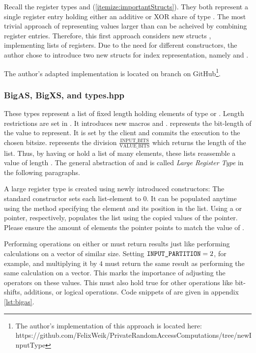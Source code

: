 \label{sub:PossibilityLargerRegisterType}
Recall the register types  and  (\ref{itemize:importantStructs}).
They both represent a single register entry holding either an additive or XOR share of type .
The most trivial approach of representing values larger than  can be acheived by combining register entries.
Therefore, this first approach considers new structs ,  implementing lists of registers.
Due to the need for different constructors, the author chose to introduce two new structs for index representation, namely  and .

The author's adapted implementation is located on branch  on GitHub\footnote{The author's implementation of this approach is located here:\\ https://github.com/FelixWeik/PrivateRandomAccessComputations/tree/newInputType}.

\subsubsection*{BigAS, BigXS, and types.hpp} \label{subsub:BigASandBigXS}
These types represent a list of fixed length holding elements of type  or .
Length restrictions are set in .
It introduces new macros  and .
 represents the bit-length of the value to represent.
It is set by the client and commits the execution to the chosen bitsize.
 represents the division $\frac{\text{INPUT\_BITS}}{\text{VALUE\_BITS}}$ which returns the length of the list.
Thus, by having  or  hold a list of  many elements, these lists reassemble a value of length .
The general abstraction of  and  is called \textit{Large Register Type} in the following paragraphs.

A large register type is created using newly introduced constructors:
The standard constructor sets each list-element to 0. 
It can be populated anytime using the  method specifying the element and its position in the list.
Using a  or  pointer, respectively, populates the list using the copied values of the pointer.
Please ensure the amount of elements the pointer points to match the value of .

Performing operations on either  or  must return results just like performing calculations on a vector of similar size.
Setting $\code{INPUT\_PARTITION} = 2$, for example, and multiplying it by $4$ must return the same result as performing the same calculation on a  vector.
This marks the importance of adjusting the operators on these values.
This must also hold true for other operations like bit-shifts, additions, or logical operations.
Code snippets of  are given in appendix \ref{lst:bigas}.

